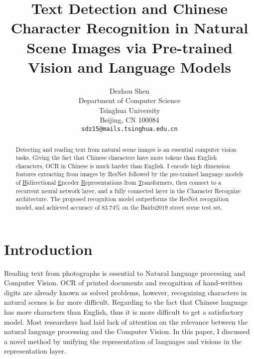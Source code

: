 \documentclass[review]{cvpr}
\begin{document}
\title{Text Detection and Chinese Character Recognition in Natural Scene Images via Pre-trained Vision and Language Models}

\author{Dezhou Shen\\
Department of Computer Science\\
Tsinghua University\\
Beijing, CN 100084\\
{\tt\small sdz15@mails.tsinghua.edu.cn}
}

\maketitle


\begin{abstract}

  Detecting and reading text from natural scene images is an essential computer vision tasks.
  Giving the fact that Chinese characters have more tokens than English characters, OCR in Chinese is much harder than English.
  I encode high dimension features extracting from images by ResNet followed by the pre-trained language models of
  \underline{B}idirectional \underline{E}ncoder \underline{R}epresentations from \underline{T}ransformers,
  then connect to a recurrent neural network layer, and a fully connected layer in the Character Recognize architecture.
  The proposed recognition model outperforms the ResNet recognition model, and achieved accuracy of $83.74\%$ on the Baidu2019 street scene test set.

\end{abstract}

\section{Introduction}

  Reading text from photographs is essential to Natural language processing and Computer Vision.
  OCR of printed documents and recognition of hand-written digits are already known as solved problems,
  however, recognizing characters in natural scenes is far more difficult.
  Regarding to the fact that Chinese language has more characters than English, thus it is more difficult to get a satisfactory model.
  Most researchers had laid lack of attention on the relevance between the natural language processing and the Computer Vision.
  In this paper, I discussed a novel method by unifying the representation of languages and visions in the representation layer.
\end{document}
